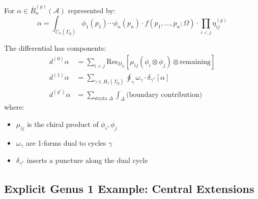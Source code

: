 \begin{theorem}
\label{thm:concrete-quantum-differential}
For $\alpha \in \bar{B}^{(g)}_n(\mathcal{A})$ represented by:
\begin{equation}
\alpha = \int_{\overline{C}_n(\Sigma_g)} \phi_1(p_1) \cdots \phi_n(p_n) \cdot f(p_1, \ldots, p_n; \Omega) \cdot \prod_{i<j} \eta_{ij}^{(g)}
\end{equation}

The differential has components:
\begin{align}
d^{(0)}\alpha &= \sum_{i<j} \text{Res}_{D_{ij}} [\mu_{ij}(\phi_i \otimes \phi_j) \otimes \text{remaining}]\\
d^{(1)}\alpha &= \sum_{\gamma \in H_1(\Sigma_g)} \oint_\gamma \omega_\gamma \cdot \delta_{\gamma^*}[\alpha]\\
d^{(g')}\alpha &= \sum_{\text{strata } \Delta} \int_\Delta \text{(boundary contribution)}
\end{align}
where:
\begin{itemize}
\item $\mu_{ij}$ is the chiral product of $\phi_i, \phi_j$
\item $\omega_\gamma$ are 1-forms dual to cycles $\gamma$
\item $\delta_{\gamma^*}$ inserts a puncture along the dual cycle
\end{itemize}
\end{theorem}

\subsection{Explicit Genus 1 Example: Central Extensions}

